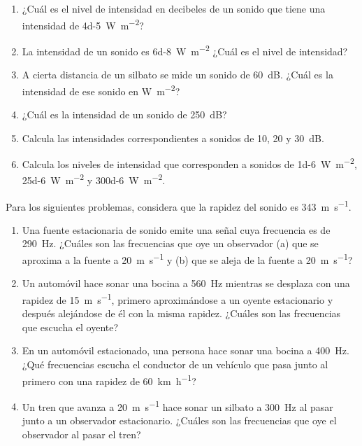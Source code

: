 \documentclass[14pt]{extarticle}
\begin{document}
\begin{enumerate}
\item ¿Cuál es el nivel de intensidad en decibeles de un sonido que tiene una intensidad de \SI{4d-5}{\watt\per\square\meter}?
\item La intensidad de un sonido es \SI{6d-8}{\watt\per\square\meter} ¿Cuál es el nivel de intensidad?
\item A cierta distancia de un silbato se mide un sonido de \SI{60}{\dB}. ¿Cuál es la intensidad de ese sonido en \unit{\watt\per\square\meter}?
\item ¿Cuál es la intensidad de un sonido de \SI{250}{\dB}?
\item Calcula las intensidades correspondientes a sonidos de \num{10}, \num{20} y \SI{30}{\dB}.
\item Calcula los niveles de intensidad que corresponden a sonidos de \SI{1d-6}{\watt\per\square\meter}, \SI{25d-6}{\watt\per\square\meter} y \SI{300d-6}{\watt\per\square\meter}.
\end{enumerate}
Para los siguientes problemas, considera que la rapidez del sonido es \SI{343}{\meter\per\second}.
\begin{enumerate}[resume*]
\item Una fuente estacionaria de sonido emite una señal cuya frecuencia es de \SI{290}{\hertz}. ¿Cuáles son las frecuencias que oye un observador (a) que se aproxima a la fuente a \SI{20}{\meter\per\second} y (b) que se aleja de la fuente a \SI{20}{\meter\per\second}?
\item Un automóvil hace sonar una bocina a \SI{560}{\hertz} mientras se desplaza con una rapidez de \SI{15}{\meter\per\second}, primero aproximándose a un oyente estacionario y después alejándose de él con la misma rapidez. ¿Cuáles son las frecuencias que escucha el oyente?
\item En un automóvil estacionado, una persona hace sonar una bocina a \SI{400}{\hertz}. ¿Qué frecuencias escucha el conductor de un vehículo que pasa junto al primero con una rapidez de \SI{60}{\kilo\meter\per\hour}?
\item Un tren que avanza a \SI{20}{\meter\per\second} hace sonar un silbato a \SI{300}{\hertz} al pasar junto a un observador estacionario. ¿Cuáles son las frecuencias que oye el observador al pasar el tren?
\end{enumerate}
\end{document}
